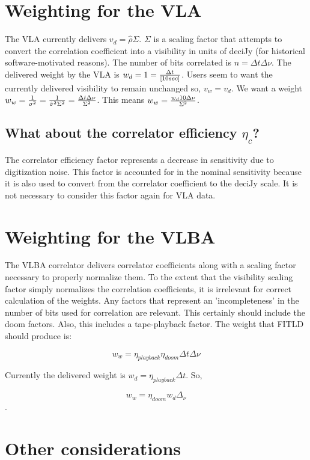 \section{Weighting for the VLA}

The VLA currently delivers $v_d = \hat{\rho}\Sigma$.  $\Sigma$ is a
scaling factor that attempts to convert the correlation coefficient
into a visibility in units of deciJy (for historical
software-motivated reasons).  The number of bits correlated is $n =
\Delta t\Delta\nu$.  The delivered weight by the VLA is $w_d = 1 =
{\Delta t\over [10 sec]}$.  Users seem to want the currently delivered
visibility to remain unchanged so, $v_w = v_d$.  We want a weight $w_w
= {1\over\sigma^2} = {1\over\hat{\sigma}^2\Sigma^2} = {\Delta t\Delta\nu\over\Sigma^2}$.  This means
$w_w = {w_d 10 \Delta\nu\over\Sigma^2}$.

\subsection{What about the correlator efficiency $\eta_c$?}

The correlator efficiency factor represents a decrease in sensitivity
due to digitization noise.  This factor is accounted for in the
nominal sensitivity because it is also used to convert from the
correlator coefficient to the deciJy scale. It is not necessary to
consider this factor again for VLA data.

\section{Weighting for the VLBA}

The VLBA correlator delivers correlator coefficients along with a
scaling factor necessary to properly normalize them.  To the extent
that the visibility scaling factor simply normalizes the correlation
coefficients, it is irrelevant for correct calculation of the weights.
Any factors that represent an 'incompleteness' in the number of bits
used for correlation are relevant.  This certainly should include the
doom factors.  Also, this includes a tape-playback factor.  The weight
that FITLD should produce is:

$$w_w = \eta_{playback}\eta_{doom}\Delta t\Delta\nu$$

Currently the delivered weight is $w_d = \eta_{playback}\Delta t$.  So,

$$w_w = \eta_{doom}w_d\Delta_\nu$$.

\section{Other considerations}

